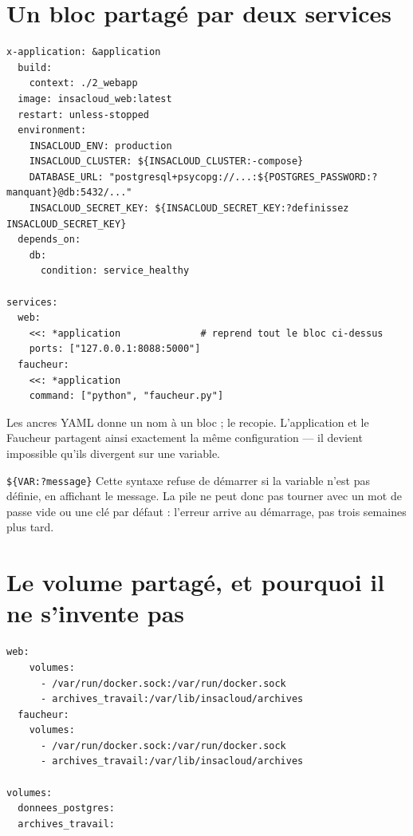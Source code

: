 \section{Un bloc partagé par deux services}

\begin{lstlisting}[language=yamlplus,caption={\fichier{docker-compose.yml} --- l'ancre YAML}]
x-application: &application
  build:
    context: ./2_webapp
  image: insacloud_web:latest
  restart: unless-stopped
  environment:
    INSACLOUD_ENV: production
    INSACLOUD_CLUSTER: ${INSACLOUD_CLUSTER:-compose}
    DATABASE_URL: "postgresql+psycopg://...:${POSTGRES_PASSWORD:?manquant}@db:5432/..."
    INSACLOUD_SECRET_KEY: ${INSACLOUD_SECRET_KEY:?definissez INSACLOUD_SECRET_KEY}
  depends_on:
    db:
      condition: service_healthy

services:
  web:
    <<: *application              # reprend tout le bloc ci-dessus
    ports: ["127.0.0.1:8088:5000"]
  faucheur:
    <<: *application
    command: ["python", "faucheur.py"]
\end{lstlisting}

\begin{notion}{Les ancres YAML}
 donne un nom à un bloc ;  le
recopie. L'application et le Faucheur partagent ainsi exactement la même
configuration --- il devient impossible qu'ils divergent sur une variable.
\end{notion}

\begin{notion}{\texttt{\$\{VAR:?message\}}}
Cette syntaxe refuse de démarrer si la variable n'est pas définie, en
affichant le message. La pile ne peut donc pas tourner avec un mot de passe
vide ou une clé par défaut : l'erreur arrive au démarrage, pas trois semaines
plus tard.
\end{notion}

\section{Le volume partagé, et pourquoi il ne s'invente pas}

\begin{lstlisting}[language=yamlplus]
  web:
    volumes:
      - /var/run/docker.sock:/var/run/docker.sock
      - archives_travail:/var/lib/insacloud/archives
  faucheur:
    volumes:
      - /var/run/docker.sock:/var/run/docker.sock
      - archives_travail:/var/lib/insacloud/archives

volumes:
  donnees_postgres:
  archives_travail:
\end{lstlisting}


